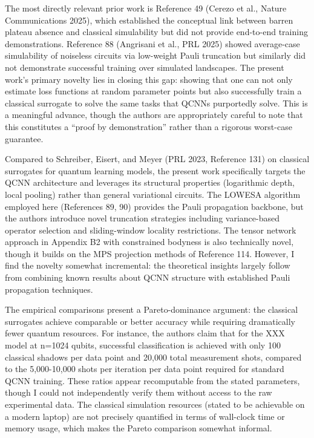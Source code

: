 \documentclass[10pt,letterpaper]{article}
\begin{document}
The most directly relevant prior work is Reference 49 (Cerezo et al., Nature Communications 2025), which established the conceptual link between barren plateau absence and classical simulability but did not provide end-to-end training demonstrations. Reference 88 (Angrisani et al., PRL 2025) showed average-case simulability of noiseless circuits via low-weight Pauli truncation but similarly did not demonstrate successful training over simulated landscapes. The present work's primary novelty lies in closing this gap: showing that one can not only estimate loss functions at random parameter points but also successfully train a classical surrogate to solve the same tasks that QCNNs purportedly solve. This is a meaningful advance, though the authors are appropriately careful to note that this constitutes a ``proof by demonstration'' rather than a rigorous worst-case guarantee.

Compared to Schreiber, Eisert, and Meyer (PRL 2023, Reference 131) on classical surrogates for quantum learning models, the present work specifically targets the QCNN architecture and leverages its structural properties (logarithmic depth, local pooling) rather than general variational circuits. The LOWESA algorithm employed here (References 89, 90) provides the Pauli propagation backbone, but the authors introduce novel truncation strategies including variance-based operator selection and sliding-window locality restrictions. The tensor network approach in Appendix B2 with constrained bodyness is also technically novel, though it builds on the MPS projection methods of Reference 114. However, I find the novelty somewhat incremental: the theoretical insights largely follow from combining known results about QCNN structure with established Pauli propagation techniques.

The empirical comparisons present a Pareto-dominance argument: the classical surrogates achieve comparable or better accuracy while requiring dramatically fewer quantum resources. For instance, the authors claim that for the XXX model at n=1024 qubits, successful classification is achieved with only 100 classical shadows per data point and 20,000 total measurement shots, compared to the 5,000-10,000 shots per iteration per data point required for standard QCNN training. These ratios appear recomputable from the stated parameters, though I could not independently verify them without access to the raw experimental data. The classical simulation resources (stated to be achievable on a modern laptop) are not precisely quantified in terms of wall-clock time or memory usage, which makes the Pareto comparison somewhat informal.
\end{document}
